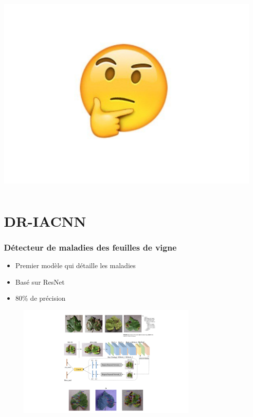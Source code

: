 \documentclass{beamer}
\begin{document}
\begin{frame}
\begin{columns}[c]
		\includegraphics[width=\textwidth]{1}
	\end{columns}
	
\end{frame}

\section{DR-IACNN}

\begin{frame}
	\frametitle{Détecteur de maladies des feuilles de vigne}
	\begin{itemize}
		\item Premier modèle qui détaille les maladies 
		\item Basé sur ResNet 
		\item 80\% de précision
	\end{itemize}
	
			\begin{figure}
	\includegraphics[width=0.8\textwidth]{reseau}
	\label{fig:example}
\end{figure}
	
\end{frame}
\end{document}
